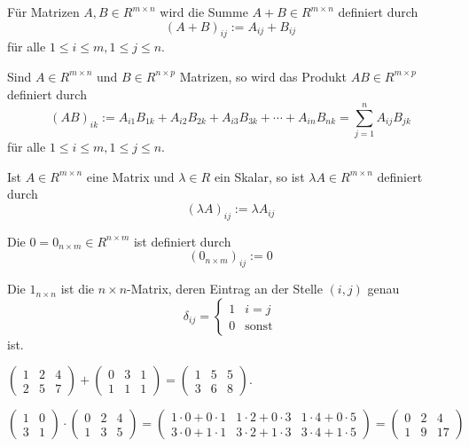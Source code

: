 \begin{definition}
    Für Matrizen $A,B \in R^{m\times n}$ wird die Summe
    $A+B \in R^{m\times n}$ definiert durch
    \[(A+B)_{ij} := A_{ij}+B_{ij}\]
    für alle $1\leq i\leq m, 1\leq j\leq n$.

    \medbreak
    Sind $A \in R^{m \times n}$ und $B \in R^{n \times p}$ Matrizen,
    so wird das Produkt $AB \in R^{m\times p}$ definiert durch
    \[(AB)_{ik} := A_{i1}B_{1k} + A_{i2}B_{2k} + A_{i3}B_{3k} + \cdots
    + A_{in} B_{nk} = \sum_{j=1}^n A_{ij} B_{jk} \]
    für alle $1\leq i\leq m, 1\leq j\leq n$.

    \medbreak
    Ist $A\in R^{m\times n}$ eine Matrix und $\lambda\in R$ ein Skalar, so ist $\lambda A\in R^{m\times n}$ definiert durch
    \[(\lambda A)_{ij} := \lambda A_{ij}\]

    \medbreak
    Die  $0=0_{n\times m}\in R^{n\times m}$ ist definiert durch
    \[(0_{n\times m})_{ij} := 0\]

    \medbreak
    Die  $1_{n\times n}$ ist die $n\times n$-Matrix, deren Eintrag an der Stelle $(i,j)$ genau
    \[\delta_{ij} = \begin{cases}
                        1 & i = j \\ 0 & \text{sonst}
    \end{cases}\]
    ist.
\end{definition}

\begin{example}
    $\begin{pmatrix}
         1& 2& 4\\2& 5& 7
    \end{pmatrix}
    + \begin{pmatrix}
          0& 3& 1\\1& 1& 1
    \end{pmatrix}
    = \begin{pmatrix}
          1& 5& 5\\3& 6& 8
    \end{pmatrix}$.
\end{example}
\begin{example}
    \[\left(\begin{array}{cc}
                1 & 0 \\
                3 & 1
    \end{array}\right)\cdot\left(\begin{array}{ccc}
                                     0 & 2 & 4 \\
                                     1 & 3 & 5
    \end{array}\right)
    = \begin{pmatrix}
          1\cdot0+0\cdot1 & 1 \cdot 2 + 0\cdot3 & 1\cdot4+0\cdot5   \\
          3\cdot0+1\cdot1 & 3\cdot2+1\cdot3     & 3\cdot4 + 1\cdot5
    \end{pmatrix}
    = \begin{pmatrix}
          0& 2& 4\\1& 9& 17
    \end{pmatrix} \]
\end{example}

